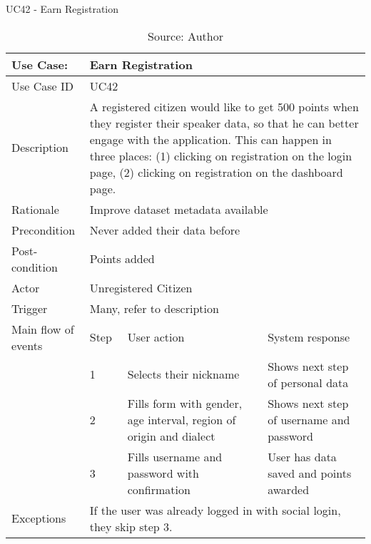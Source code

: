 \begin{table}[ht]
\centering
\caption{UC42 - Earn Registration}
\label{uc:42}
\begin{tabular}{|p{3cm}|p{1cm}|p{5cm}|p{5cm}|}
\hline
Use Case:       & \multicolumn{3}{p{11cm}|}{Earn Registration} \\ \hline
Use Case ID     & \multicolumn{3}{p{11cm}|}{UC42} \\ \hline
Description     & \multicolumn{3}{p{11cm}|}{A registered citizen would like to get 500 points when they register their speaker data, so that he can better engage with the application. This can happen in three places: (1) clicking on registration on the login page, (2) clicking on registration on the dashboard page.} \\ \hline
Rationale       & \multicolumn{3}{p{11cm}|}{Improve dataset metadata available} \\ \hline
Precondition    & \multicolumn{3}{p{11cm}|}{Never added their data before} \\ \hline
Post-condition  & \multicolumn{3}{p{11cm}|}{Points added} \\ \hline
Actor           & \multicolumn{3}{p{11cm}|}{Unregistered Citizen} \\ \hline
Trigger         & \multicolumn{3}{p{11cm}|}{Many, refer to description} \\ \hline
Main flow of events & Step  & User action & System response \\ \hline
                    & 1     & Selects their nickname & Shows next step of personal data \\ \hline
                    & 2     & Fills form with gender, age interval, region of origin and dialect & Shows next step of username and password \\ \hline
                    & 3     & Fills username and password with confirmation & User has data saved and points awarded \\ \hline
Exceptions      & \multicolumn{3}{p{11cm}|}{If the user was already logged in with social login, they skip step 3.} \\ \hline
\end{tabular}
\caption*{Source: Author}
\end{table}

